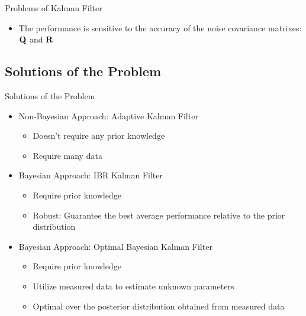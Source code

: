 \begin{frame}{Problems of Kalman Filter}
\begin{itemize}
    \item The performance is sensitive to the accuracy of the noise covariance matrixes: ${\bf Q}$ and ${\bf R}$\cite{Sangsuk-Iam1990}
\end{itemize}
\end{frame}

\subsection{Solutions of the Problem}

\begin{frame}{Solutions of the Problem}
\begin{itemize}
    \item Non-Bayesian Approach: Adaptive Kalman Filter
    \begin{itemize}
        \item Doesn't require any prior knowledge
        \item Require many data
    \end{itemize}
    \pause
    \item Bayesian Approach: IBR Kalman Filter
    \begin{itemize}
        \item Require prior knowledge
        \item Robust: Guarantee the best average performance relative to the prior distribution
    \end{itemize}
    \pause
    \item Bayesian Approach: Optimal Bayesian Kalman Filter
    \begin{itemize}
        \item Require prior knowledge
        \item Utilize measured data to estimate unknown parameters
        \item Optimal over the posterior distribution obtained from measured data
    \end{itemize}
\end{itemize}    
\end{frame}